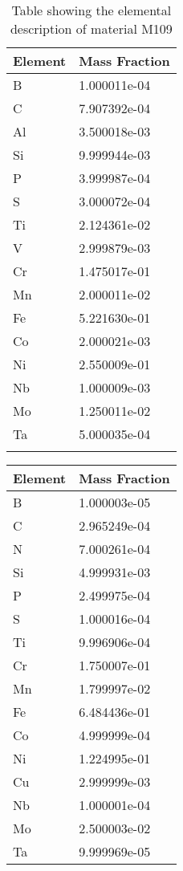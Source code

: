 \begin{centering}
\begin{longtable}[ht!]
{ p{} | p{} }
\hline
Element & Mass Fraction\\
\hline

B &  1.000011e-04\\
C &  7.907392e-04\\
Al &  3.500018e-03\\
Si &  9.999944e-03\\
P &  3.999987e-04\\
S &  3.000072e-04\\
Ti &  2.124361e-02\\
V &  2.999879e-03\\
Cr &  1.475017e-01\\
Mn &  2.000011e-02\\
Fe &  5.221630e-01\\
Co &  2.000021e-03\\
Ni &  2.550009e-01\\
Nb &  1.000009e-03\\
Mo &  1.250011e-02\\
Ta &  5.000035e-04\\

\caption{Table showing the elemental description of material M109}
\label{table:material_M109}
\end{longtable}
\clearpage

\begin{longtable}[ht!]
{ p{} | p{} }
\hline
Element & Mass Fraction\\
\hline
B &  1.000003e-05\\
C &  2.965249e-04\\
N &  7.000261e-04\\
Si &  4.999931e-03\\
P &  2.499975e-04\\
S &  1.000016e-04\\
Ti &  9.996906e-04\\
Cr &  1.750007e-01\\
Mn &  1.799997e-02\\
Fe &  6.484436e-01\\
Co &  4.999999e-04\\
Ni &  1.224995e-01\\
Cu &  2.999999e-03\\
Nb &  1.000001e-04\\
Mo &  2.500003e-02\\
Ta &  9.999969e-05\\


\end{longtable}
\end{centering}
